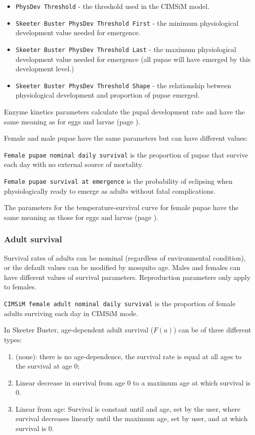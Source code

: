 \documentclass[11pt]{article}
\newcommand{\linecmd}[1]{\texttt{#1}}
\begin{document}
\begin{itemize}
	\item \linecmd{PhysDev Threshold} - the threshold used in the CIMSiM model.
	\item \linecmd{Skeeter Buster PhysDev Threshold First} - the minimum physiological development value needed for emergence.
	\item \linecmd{Skeeter Buster PhysDev Threshold Last} - the maximum physiological development value needed for emergence (all pupae will have emerged by this development level.)
	\item \linecmd{Skeeter Buster PhysDev Threshold Shape} - the relationship between physiological development and proportion of pupae emerged.
\end{itemize}

Enzyme kinetics parameters calculate the pupal development rate and have the same meaning as for eggs and larvae (page \pageref{kinetics}).

Female and male pupae have the same parameters but can have different values:

\linecmd{Female pupae nominal daily survival} is the proportion of pupae that survive each day with no external source of mortality.

\linecmd{Female pupae survival at emergence} is the probability of eclipsing when physiologically ready to emerge as adults without fatal complications.

The parameters for the temperature-survival curve for female pupae have the same meaning as those for eggs and larvae (page \pageref{tempsurv}).

\subsubsection{Adult survival}

Survival rates of adults can be nominal (regardless of environmental condition), or the default values can be modified by mosquito age. Males and females can have different values of survival parameters. Reproduction parameters only apply to females.

\linecmd{CIMSiM female adult nominal daily survival} is the proportion of female adults surviving each day in CIMSiM mode.

In Skeeter Buster, age-dependent adult survival ($F(a)$) can be of three different types:
\begin{enumerate}
	\item (none): there is no age-dependence, the survival rate is equal at all ages to the survival at age 0;
	\item Linear decrease in survival from age 0 to a maximum age at which survival is 0. 
	\item Linear from age: Survival is constant until and age, set by the user, where survival decreases linearly until the maximum age, set by user, and at which survival is 0. 
\end{enumerate}
\end{document}
